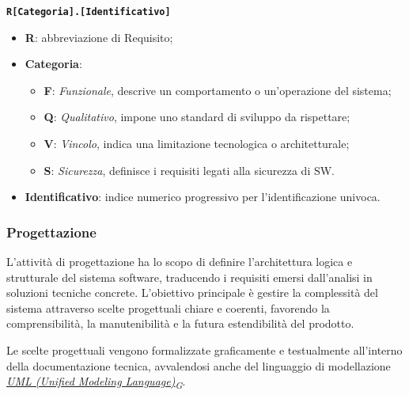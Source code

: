 \documentclass[12pt, a4paper]{article}
\newcommand{\urlglossario}{https://skynetunigroup.github.io/Code_Guardian/Documentazione/PB/glossario_v2.0.0.pdf} %
\newcommand{\glo}[2]{\href{\urlglossario\#nameddest=#2}{#1\textsubscript{G}}}
\begin{document}
\begin{center}
\textbf{\texttt{R[Categoria].[Identificativo]}}
\end{center}
\begin{itemize}
    \item \textbf{R}: abbreviazione di Requisito;
    \item \textbf{Categoria}:
    \begin{itemize}
        \item \textbf{F}: \textit{Funzionale}, descrive un comportamento o un'operazione del sistema;
        \item \textbf{Q}: \textit{Qualitativo}, impone uno standard di sviluppo da rispettare;
        \item \textbf{V}: \textit{Vincolo}, indica una limitazione tecnologica o architetturale;
        \item \textbf{S}: \textit{Sicurezza}, definisce i requisiti legati alla sicurezza di SW.
    \end{itemize}
    \item \textbf{Identificativo}: indice numerico progressivo per l'identificazione univoca.
\end{itemize}

\subsubsection{Progettazione}

L'attività di progettazione ha lo scopo di definire l'architettura logica e strutturale del sistema software, traducendo i requisiti emersi dall'analisi in soluzioni tecniche concrete. L'obiettivo principale è gestire la complessità del sistema attraverso scelte progettuali chiare e coerenti, favorendo la comprensibilità, la manutenibilità e la futura estendibilità del prodotto.

Le scelte progettuali vengono formalizzate graficamente e testualmente all'interno della documentazione tecnica, avvalendosi anche del linguaggio di modellazione \textit{\glo{UML (Unified Modeling Language)}{uml}}.
\end{document}
